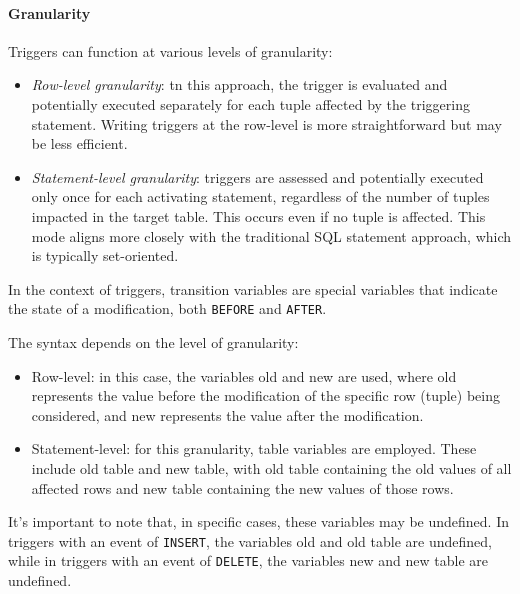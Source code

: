 \paragraph*{Granularity}
Triggers can function at various levels of granularity:
\begin{itemize}
    \item \textit{Row-level granularity}: tn this approach, the trigger is evaluated and potentially executed separately for each tuple affected by the triggering statement. 
        Writing triggers at the row-level is more straightforward but may be less efficient.
    \item \textit{Statement-level granularity}: triggers are assessed and potentially executed only once for each activating statement, regardless of the number of tuples impacted in the target table. 
        This occurs even if no tuple is affected. 
        This mode aligns more closely with the traditional SQL statement approach, which is typically set-oriented.
\end{itemize}
\begin{definition}
    In the context of triggers, transition variables are special variables that indicate the state of a modification, both \texttt{BEFORE} and \texttt{AFTER}. 
\end{definition}
The syntax depends on the level of granularity: 
\begin{itemize}
    \item Row-level: in this case, the variables old and new are used, where old represents the value before the modification of the specific row (tuple) being considered, and new represents the value after the modification.
    \item Statement-level: for this granularity, table variables are employed.
     These include old table and new table, with old table containing the old values of all affected rows and new table containing the new values of those rows.
\end{itemize}
It's important to note that, in specific cases, these variables may be undefined. 
In triggers with an event of \texttt{INSERT}, the variables old and old table are undefined, while in triggers with an event of \texttt{DELETE}, the variables new and new table are undefined.  
